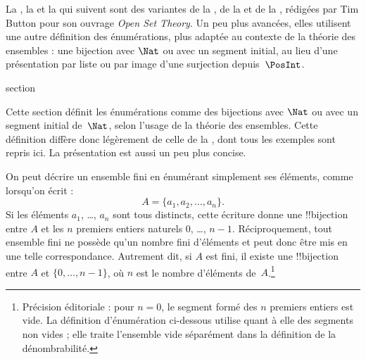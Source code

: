 \documentclass[11pt,a4paper,openany]{memoir}
\begin{document}
\endgroup


\begin{editorial}
La , la
 et la 
qui suivent sont des variantes de la
, de la  et
de la , rédigées par Tim Button pour son
ouvrage \emph{Open Set Theory}. Un peu plus avancées, elles
utilisent une autre définition des énumérations, plus adaptée
au contexte de la théorie des ensembles : une bijection avec
$\Nat$ ou avec un segment initial, au lieu d'une présentation
par liste ou par image d'une surjection depuis~$\PosInt$.
\end{editorial}


\begingroup
\expandafter\def\csname ol@sectioncs\endcsname{section}
\def\olfilename{enumerability-alt}




\begin{editorial}
  Cette section définit les énumérations comme des bijections avec
  $\Nat$ ou avec un segment initial de~$\Nat$, selon l'usage de
  la théorie des ensembles. Cette définition diffère donc légèrement
  de celle de la , dont tous les exemples sont repris
  ici. La présentation est aussi un peu plus concise.
\end{editorial}

On peut décrire un ensemble fini en énumérant simplement ses éléments,
comme lorsqu'on écrit :
\[
  A = \{a_1, a_2, \ldots, a_n\}.
\]
Si les éléments $a_1$, \dots, $a_n$ sont tous distincts, cette
écriture donne une !!{bijection} entre $A$ et les $n$ premiers
entiers naturels $0$, \dots, $n-1$. Réciproquement, tout ensemble
fini ne possède qu'un nombre fini d'éléments et peut donc être mis
en une telle correspondance. Autrement dit, si $A$ est fini, il
existe une !!{bijection} entre $A$ et $\{0, \dots, n-1\}$, où
$n$ est le nombre d'éléments de~$A$.\footnote{Précision éditoriale :
pour $n=0$, le segment formé des $n$ premiers entiers est vide.
La définition d'énumération ci-dessous utilise quant à elle des
segments non vides ; elle traite l'ensemble vide séparément dans
la définition de la dénombrabilité.}
\end{document}
